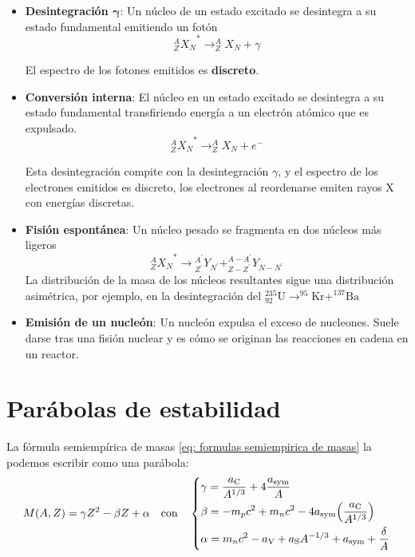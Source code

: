 \begin{itemize}
    Esto compite con la desintegración $\beta^+$, pero sólo en los casos en los que tenemos $M_X-M_Y<2m_e$ ya que si no se cumpliese no se conserva la energía y estaría prohibido.

    \item \textbf{Desintegración $\bm{\gamma}$}: Un núcleo de un estado excitado se desintegra a su estado fundamental emitiendo un fotón 
    $${^A _Z X_N }^*\longrightarrow ^A _Z X_N+\gamma$$
    
    El espectro de los fotones emitidos es \textbf{discreto}.
    
    \item \textbf{Conversión interna}: El núcleo en un estado excitado se desintegra a su estado fundamental transfiriendo energía a un electrón atómico que es expulsado.
    $${^A _Z X_N }^*\longrightarrow ^A _Z X_N+e^-$$

    Esta desintegración compite con la desintegración $\gamma$, y el espectro de los electrones emitidos es discreto, los electrones al reordenarse emiten rayos X con energías discretas.
    \item \textbf{Fisión espontánea}: Un núcleo pesado se fragmenta en dos núcleos más ligeros
    $${^A _Z X_N }^*\longrightarrow {^{A^\prime} _{Z^\prime} Y_{N^\prime}+ ^{A-A^\prime} _{Z-Z^\prime} Y_{N-N^\prime}  }$$
    La distribución de la masa de los núcleos resultantes sigue una  distribución asimétrica, por ejemplo, en la desintegración del $^{235} _{92} \mathrm{U} \longrightarrow ^{95}\mathrm{Kr}+^{137}\mathrm{Ba}$
    \item \textbf{Emisión de un nucleón}: Un nucleón expulsa el exceso de nucleones. Suele darse tras una fisión nuclear y es cómo se originan las reacciones en cadena en un reactor.
\end{itemize}

\section{Parábolas de estabilidad}
La fórmula semiempírica de masas \ref{eq: formulas semiempirica de masas} la podemos escribir como una parábola:
\begin{equation}
    M(A,Z)=\gamma Z^2-\beta Z + \alpha \quad \text{con} \quad \left \{ 
    \begin{aligned}
    &\gamma= \frac{a_\mathrm{C}}{A^{1/3}}+4\frac{a_\mathrm{sym}}{A} \\
    &\beta=-m_pc^2+m_nc^2-4a_\mathrm{sym}\qty(\frac{a_\mathrm{C}}{A^{1/3}}) \\
    &\alpha= m_nc^2-a_\mathrm{V} +a_\mathrm{S}A^{-1/3}+a_\mathrm{sym} + \frac{\delta}{A}
    \end{aligned} \right.
\end{equation}


